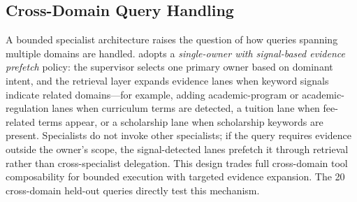 \subsection{Cross-Domain Query Handling}
\label{sec:cross_domain}

A bounded specialist architecture raises the question of how queries spanning multiple domains are handled. \system{} adopts a \emph{single-owner with signal-based evidence prefetch} policy: the supervisor selects one primary owner based on dominant intent, and the retrieval layer expands evidence lanes when keyword signals indicate related domains---for example, adding academic-program or academic-regulation lanes when curriculum terms are detected, a tuition lane when fee-related terms appear, or a scholarship lane when scholarship keywords are present. Specialists do not invoke other specialists; if the query requires evidence outside the owner's scope, the signal-detected lanes prefetch it through retrieval rather than cross-specialist delegation. This design trades full cross-domain tool composability for bounded execution with targeted evidence expansion. The 20 cross-domain held-out queries directly test this mechanism.
